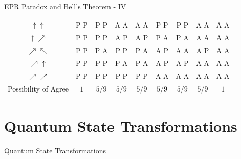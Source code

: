 \documentclass{beamer}
\begin{document}
\begin{frame}{EPR Paradox and Bell's Theorem - IV}
{\begin{table}[h!]
\begin{center}
\begin{tabular}{c|c|c|c|c|c|c|c|c}
      $\uparrow \uparrow$ & P          P                  & P          P                  & A          A                  & A          A                  & P          P                  & P          P                  & A          A                  & A          A                  \\
      $\uparrow \nearrow$ & P          P                  & P          P                  & A          P                  & A          P                  & P          A                  & P          A                  & A          A                  & A          A                  \\
      $\nearrow \nwarrow$ & P          P                  & P          A                  & P          P                  & P          A                  & A          P                  & A          A                  & A          P                  & A          A                  \\
      $\nearrow \uparrow$ & P          P                  & P          P                  & P          A                  & P          A                  & A          P                  & A          P                  & A          A                  & A          A                  \\
      $\nearrow \nearrow$ & P          P                  & P          P                  & P          P                  & P          P                  & A          A                  & A          A                  & A          A                  & A          A                  \\
      \hline
     Possibility of Agree & $1$                           & $5/9$                         & $5/9$                         & $5/9$                         & $5/9$                         & $5/9$                         & $5/9$                         & $1$                           \\
    \end{tabular}
  \end{center}
  \end{table}
  }%
\end{frame}

\section{Quantum State Transformations}
\begin{frame}
  Quantum State Transformations
\end{frame}
\end{document}
